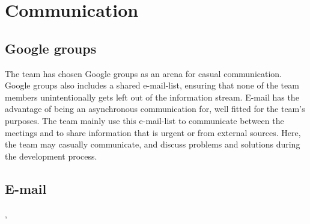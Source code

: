 \section{Communication}
\subsection{Google groups}
The team has chosen Google groups as an arena for casual communication. Google groups also includes a shared e-mail-list, ensuring that none of the team members unintentionally gets left out of the information stream.  E-mail has the advantage of being an asynchronous communication for, well fitted for the team's purposes. The team mainly use this e-mail-list to communicate between the meetings and to share information that is urgent or from external sources.  Here, the team may casually communicate, and discuss problems and solutions during the development process.


\subsection{E-mail}
, 